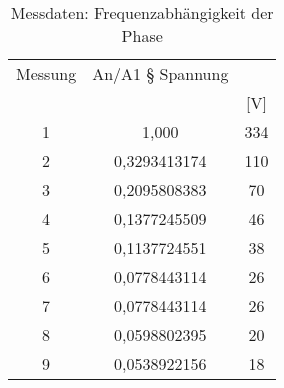 
\begin{table}[h!]
  \centering
  \caption{Messdaten: Frequenzabhängigkeit der Phase}
  \label{tab:recht}
  \begin{tabular}{c c c}
    \toprule
Messung & An/A1 § Spannung\\
 &  & [V] \\
    \midrule


    1 &	 1,000  & 334\\
    2 &	 0,3293413174  & 110\\
    3 &	 0,2095808383  & 70\\
    4 &	 0,1377245509  & 46\\
    5 &	 0,1137724551  & 38\\
    6 &	 0,0778443114  & 26\\
    7 &	 0,0778443114  & 26\\
    8 &	 0,0598802395  & 20\\
    9 &	 0,0538922156  & 18\\


    \bottomrule
  \end{tabular}
\end{table}

